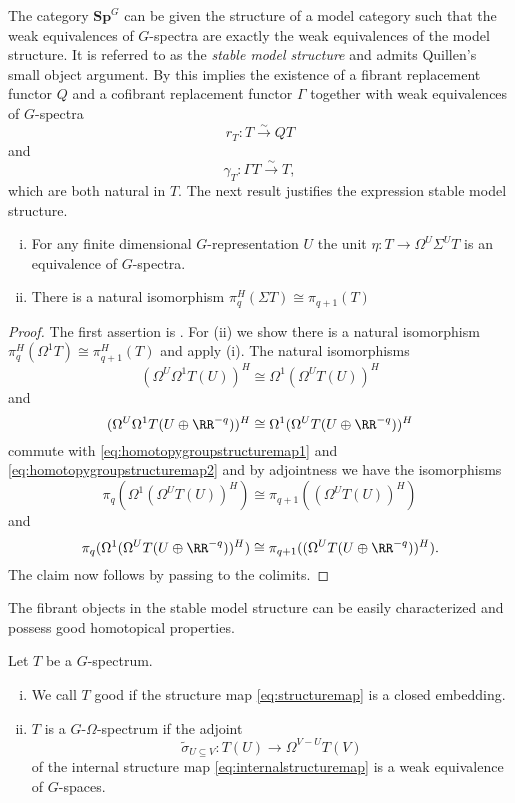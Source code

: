 The category $\mathbf{Sp}^G$ can be given the structure of a model
category \cite[Theorem~III.4.2, \pno~47]{mandellmay} such that the weak equivalences
of $G$-spectra are exactly the weak equivalences of the model structure. 
It is referred to as the \textit{stable model structure}
and admits Quillen's
small object argument. By \cite[Theorem~2.1.14, \pno~33]{hoveymodelcats} 
this implies the existence of a fibrant replacement 
functor $Q$ and a cofibrant replacement functor $\Gamma$
together with weak equivalences of $G$-spectra
\[
r_T: T\xrightarrow{\sim} QT
\]
and
\[
\gamma_T:\Gamma T\xrightarrow{\sim} T,
\]
which are both natural in $T$. The next result justifies the expression
stable model structure.


\begin{lem}\label{lem:spectrumsuspensionshift}
\begin{enumerate}[(i)]
\item For any finite dimensional $G$-representation $U$
the unit $\eta:T\to \Omega^U\Sigma^UT$ is an equivalence
of $G$-spectra.
\item There is a natural isomorphism $\pi^H_q(\Sigma T)\cong \pi_{q+1}(T)$
\end{enumerate}
\end{lem}
\begin{proof}
The first assertion is \cite[Lemma~3.8, \pno~46]{mandellmay}. For (ii)
we show there is a natural isomorphism $\pi_q^H(\Omega^1 T)\cong \pi_{q+1}^H(T)$
and apply (i). The natural isomorphisms 
\[
(\Omega^U\Omega^1T(U))^H\cong\Omega^1(\Omega^UT(U))^H
\]
and 
\[
(\Omega^U\Omega^1T(U\oplus \RR^{-q}))^H\cong\Omega^1(\Omega^UT(U\oplus\RR^{-q}))^H
\]
commute with \eqref{eq:homotopygroupstructuremap1} and  \eqref{eq:homotopygroupstructuremap2} 
and by adjointness we have the isomorphisms
\[
\pi_q(\Omega^1(\Omega^UT(U))^H)\cong \pi_{q+1}((\Omega^UT(U))^H)
\]
and
\[
\pi_q(\Omega^1(\Omega^UT(U\oplus\RR^{-q}))^H)\cong \pi_{q+1}((\Omega^UT(U\oplus\RR^{-q}))^H).
\]
The claim now follows by passing to the colimits.
\end{proof}

The fibrant objects in the stable model structure can be easily
characterized and possess good homotopical properties.
\begin{mydef}
Let $T$ be a $G$-spectrum.
\begin{enumerate}[(i)]
\item We call $T$ good if the structure map \eqref{eq:structuremap}
is a closed embedding.
\item $T$ is a $G$-$\Omega$-spectrum if the adjoint
\begin{equation}
\tilde \sigma_{U\subseteq V}: T(U)\to \Omega^{V-U}T(V)\label{eq:adjointinternalstructuremap}
\end{equation}
of the internal structure map \eqref{eq:internalstructuremap} is
a weak equivalence of $G$-spaces.
\end{enumerate}
\end{mydef}

